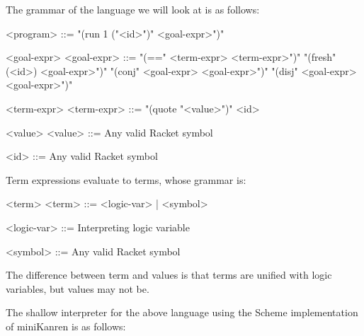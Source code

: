 The grammar of the language we will look at is as follows:

\begin{framed}
\begin{grammar}
<program> ::= "(run 1 ("<id>")" <goal-expr>")"
\end{grammar}

\begin{indentgrammar}{<goal-expr>}
<goal-expr> ::= "(==" <term-expr> <term-expr>")"
         \alt "(fresh" (<id>) <goal-expr>")"
         \alt "(conj" <goal-expr> <goal-expr>")"
         \alt "(disj" <goal-expr> <goal-expr>")"
\end{indentgrammar}

\begin{indentgrammar}{<term-expr>}
<term-expr> ::= "(quote "<value>")"
            \alt <id>
\end{indentgrammar}

\begin{indentgrammar}{<value>}
<value> ::= Any valid Racket symbol

<id> ::= Any valid Racket symbol
\end{indentgrammar}

Term expressions evaluate to terms, whose grammar is:

\begin{indentgrammar}{<term>}
<term> ::= <logic-var> | <symbol>

<logic-var> ::= Interpreting logic variable

<symbol> ::= Any valid Racket symbol
\end{indentgrammar}

The difference between term and values is that terms are unified with logic
variables, but values may not be.
\end{framed}

The shallow interpreter for the above language using the Scheme implementation
of miniKanren is as follows:

